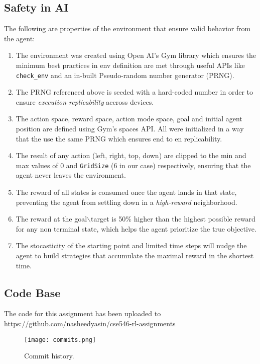 \documentclass{article} %
\begin{document}
\subsection{Safety in AI}
The following are properties of the environment that ensure valid behavior from the agent:

\begin{enumerate}
    \item The environment was created using Open AI's Gym library \cite[]{1606.01540}
        which ensures the minimum best practices in env definition are met through useful
        APIs like \verb|check_env| and an in-built Pseudo-random number generator (PRNG).
    \item The PRNG referenced above is seeded with a hard-coded number in order to ensure
        \textit{execution replicability} accross devices.
    \item The action space, reward space, action mode space, goal and initial agent position
        are defined using Gym's spaces API. All were initialized in a way that the use the same
        PRNG which ensures end to en replicability.
    \item The result of any action (left, right, top, down) are clipped to the min and max
        values of 0 and \verb|GridSize| (6 in our case) respectively, ensuring that the
        agent never leaves the environment.
    \item The reward of all states is consumed once the agent lands in that state, preventing 
        the agent from settling down in a \textit{high-reward} neighborhood.
    \item The reward at the goal$\backslash$target is 50\% higher than the highest possible reward for
        any non terminal state, which helps the agent prioritize the true objective.
    \item The stocasticity of the starting point and limited time steps will nudge the agent
        to build strategies that accumulate the maximal reward in the shortest time.
\end{enumerate}

\subsection*{Code Base}
The code for this assignment has been uploaded to \url{https://github.com/nasheedyasin/cse546-rl-assignments}

\begin{figure}[h]
    \begin{center}
        \texttt{[image: commits.png]}
    \end{center}
    \caption{Commit history.}
\end{figure}

\printbibliography
\end{document}
